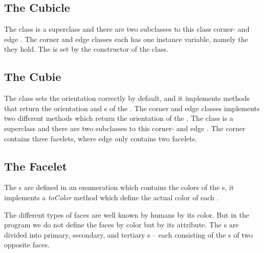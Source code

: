 \subsection{The Cubicle}
The \cubicle{} class is a superclass and there are two subclasses to this class corner- and edge \cubicle{}.
The corner and edge \cubicle{} classes each has one instance variable, namely the \cubie{} they hold. The \cpiece{} is set by the constructor of the \cubicle{} class.

\subsection{The Cubie}
The \cpiece{} class sets the orientation correctly by default, and it implements methods that return the orientation and \facelet{}s of the \cpiece{}. The corner and edge \cpiece{} classes implements two different methods which return the orientation of the \cpiece{}. The \cubie{} class is a superclass and there are two subclasses to this corner- and edge \cubie{}. The corner \cubie{} contains three facelets, where edge \cubie{} only contains two facelets.

\subsection{The Facelet}
The \facelet{}s are defined in an enumeration which contains the colors of the \facelet{}s, it implements a \textit{toColor} method which define the actual color of each \facelet{}.

The different types of faces are well known by humans by its color.
But in the program we do not define the faces by color but by its \facelet{} attribute. 
The \facelet{}s are divided into primary, secondary, and tertiary \facelet{}s -- 
each consisting of the \facelet{}s of two opposite faces. 